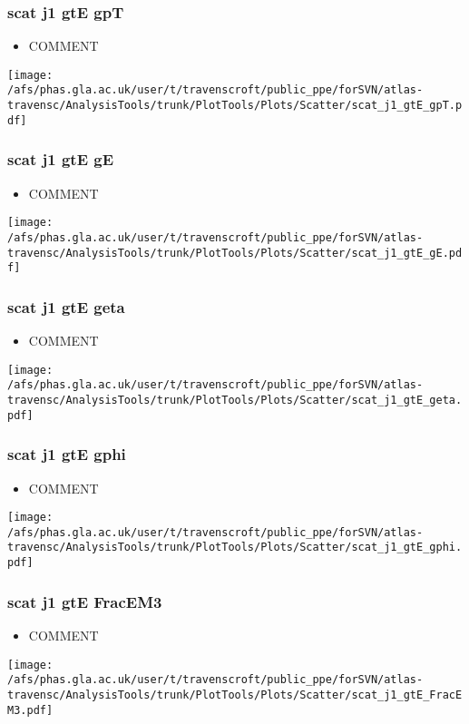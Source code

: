 \documentclass{beamer}
\begin{document}
\begin{frame}
\frametitle{scat j1 gtE gpT}
\begin{itemize}
\item COMMENT
\end{itemize}
\begin{center}
\texttt{[image: /afs/phas.gla.ac.uk/user/t/travenscroft/public\_ppe/forSVN/atlas-travensc/AnalysisTools/trunk/PlotTools/Plots/Scatter/scat\_j1\_gtE\_gpT.pdf]}
\end{center}
\end{frame}

\begin{frame}
\frametitle{scat j1 gtE gE}
\begin{itemize}
\item COMMENT
\end{itemize}
\begin{center}
\texttt{[image: /afs/phas.gla.ac.uk/user/t/travenscroft/public\_ppe/forSVN/atlas-travensc/AnalysisTools/trunk/PlotTools/Plots/Scatter/scat\_j1\_gtE\_gE.pdf]}
\end{center}
\end{frame}

\begin{frame}
\frametitle{scat j1 gtE geta}
\begin{itemize}
\item COMMENT
\end{itemize}
\begin{center}
\texttt{[image: /afs/phas.gla.ac.uk/user/t/travenscroft/public\_ppe/forSVN/atlas-travensc/AnalysisTools/trunk/PlotTools/Plots/Scatter/scat\_j1\_gtE\_geta.pdf]}
\end{center}
\end{frame}

\begin{frame}
\frametitle{scat j1 gtE gphi}
\begin{itemize}
\item COMMENT
\end{itemize}
\begin{center}
\texttt{[image: /afs/phas.gla.ac.uk/user/t/travenscroft/public\_ppe/forSVN/atlas-travensc/AnalysisTools/trunk/PlotTools/Plots/Scatter/scat\_j1\_gtE\_gphi.pdf]}
\end{center}
\end{frame}

\begin{frame}
\frametitle{scat j1 gtE FracEM3}
\begin{itemize}
\item COMMENT
\end{itemize}
\begin{center}
\texttt{[image: /afs/phas.gla.ac.uk/user/t/travenscroft/public\_ppe/forSVN/atlas-travensc/AnalysisTools/trunk/PlotTools/Plots/Scatter/scat\_j1\_gtE\_FracEM3.pdf]}
\end{center}
\end{frame}
\end{document}
